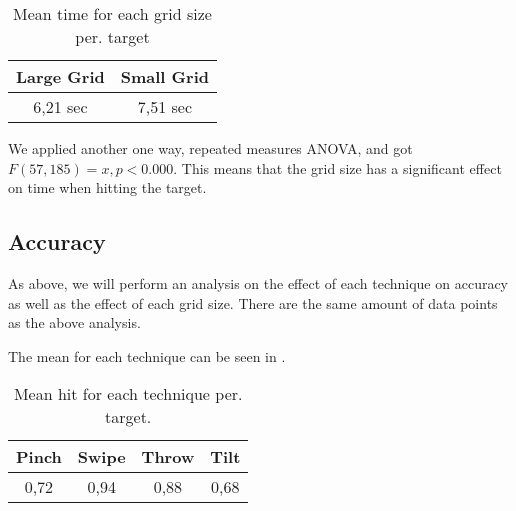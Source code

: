 \begin{table}[H]
	\centering
	\begin{tabular}{|c|c|}
		\hline
		\rowcolor[HTML]{9B9B9B} 
		\textbf{Large Grid} & \textbf{Small Grid} \\ \hline
		6,21 sec & 7,51 sec \\ \hline
	\end{tabular}
	\caption{Mean time for each grid size per. target}
	\label{fig:meanTimesSize}
\end{table}

We applied another one way, repeated measures ANOVA, and got $F(57,185) = x, p<0.000$. This means that the grid size has a significant effect on time when hitting the target. 

\subsection{Accuracy}

As above, we will perform an analysis on the effect of each technique on accuracy as well as the effect of each grid size. There are the same amount of data points as the above analysis. 

The mean for each technique can be seen in . 

\begin{table}[H]
	\centering
	\begin{tabular}{|c|c|c|c|}
		\hline
		\rowcolor[HTML]{9B9B9B} 
		\textbf{Pinch} & \textbf{Swipe} & \textbf{Throw} & \textbf{Tilt} \\ \hline
		0,72          & 0,94          & 0,88          & 0,68         \\ \hline
	\end{tabular}
	\caption{Mean hit for each technique per. target.}
	\label{tab:meanHitTechnique}
\end{table}